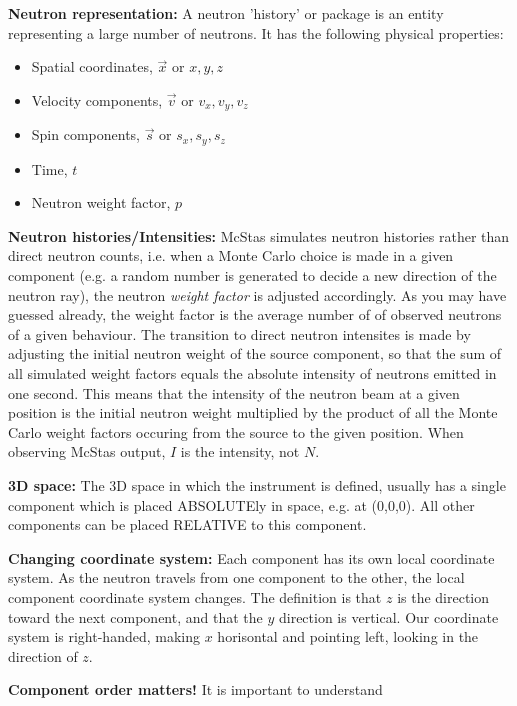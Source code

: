 \begin{itemize}
\item{{\bf Neutron representation:} A neutron 'history' or package is
  an entity representing a large number of neutrons. It has the
  following physical properties:
  \begin{itemize}
    \item{Spatial coordinates, $\vec{x}$ or $x,y,z$}
    \item{Velocity components, $\vec{v}$ or $v_x,v_y,v_z$}
    \item{Spin components, $\vec{s}$ or $s_x,s_y,s_z$}
    \item{Time, $t$}
    \item{Neutron weight factor, $p$}
  \end{itemize}
\item{{\bf Neutron histories/Intensities:} McStas simulates neutron
    histories rather than direct neutron counts, i.e. when a
    Monte Carlo choice is made in a given component (e.g. a random
    number is generated to decide a new direction of the neutron ray), 
    the neutron \emph{weight factor} is adjusted accordingly. As you
    may have guessed already, the weight factor is the 
    average number of of observed neutrons of a given behaviour.
    The transition to direct neutron intensites is made
    by adjusting the initial neutron weight of the source component,
    so that the sum of all simulated weight factors equals the
    absolute intensity of neutrons emitted in one
    second. This means that the intensity of the neutron beam at a
    given position is the initial neutron weight multiplied by the 
    product of all the Monte Carlo weight factors occuring from the
    source to the given position.  When observing McStas output, $I$
    is the intensity, not $N$.}
\item{{\bf 3D space:} The 3D space in which the instrument is defined,
  usually has a single component which is
  placed ABSOLUTEly  in space, e.g. at (0,0,0). All other components
  can be placed RELATIVE to this component.}
\item{{\bf Changing coordinate system:} Each component has its own
    local coordinate system. As the neutron travels from one component
    to the other, the local component coordinate system changes. The
    definition is that $z$ is the direction toward the next component,
    and that the $y$ direction is vertical. Our coordinate system is 
    right-handed, making $x$ horisontal and pointing left, looking in 
    the direction of $z$.}
\item{{\bf Component order matters!} It is important to understand
}}
\end{itemize}

